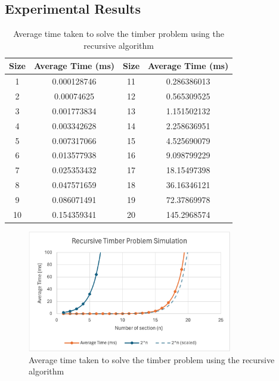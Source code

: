 \documentclass[12pt]{article}
\begin{document}
\subsection{Experimental Results}
\begin{table}[H]
    \caption{Average time taken to solve the timber problem using the recursive algorithm}
    \label{tab:timber_recursive_results}
    \centering
    \begin{tabular}{|c|c|c|c|}
        \hline
        \textbf{Size} & \textbf{Average Time (ms)} & \textbf{Size} & \textbf{Average Time (ms)} \\
        \hline
        1             & 0.000128746                & 11            & 0.286386013                \\ \hline
        2             & 0.00074625                 & 12            & 0.565309525                \\ \hline
        3             & 0.001773834                & 13            & 1.151502132                \\ \hline
        4             & 0.003342628                & 14            & 2.258636951                \\ \hline
        5             & 0.007317066                & 15            & 4.525690079                \\ \hline
        6             & 0.013577938                & 16            & 9.098799229                \\ \hline
        7             & 0.025353432                & 17            & 18.15497398                \\ \hline
        8             & 0.047571659                & 18            & 36.16346121                \\ \hline
        9             & 0.086071491                & 19            & 72.37869978                \\ \hline
        10            & 0.154359341                & 20            & 145.2968574                \\ \hline
    \end{tabular}
\end{table}

\begin{figure}[H]
    \centering
    \includegraphics[width=0.8\textwidth]{results_plot.png}
    \caption{Average time taken to solve the timber problem using the recursive algorithm}
    \label{fig:timber_recursive_results}
\end{figure}
\end{document}
